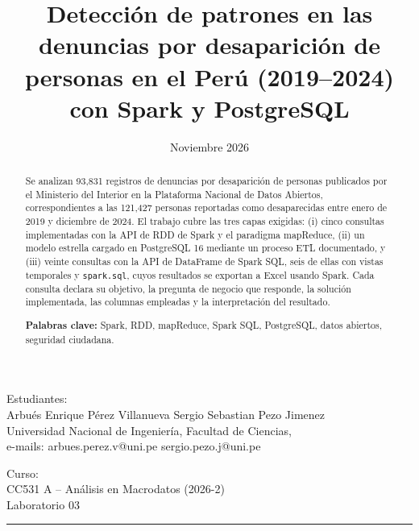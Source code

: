 \documentclass[10pt,a4paper]{article}
\title{Detecci\'on de patrones en las denuncias por desaparici\'on de personas en el Per\'u (2019--2024) con Spark y PostgreSQL}
\date{Noviembre 2026}
\theoremstyle{definition}
\begin{document}
\sloppy

\maketitle

\begin{center}
  Estudiantes:\\
  \vspace{5pt}
  {\large Arbu\'es Enrique P\'erez Villanueva \quad Sergio Sebastian Pezo Jimenez}\\
  Universidad Nacional de Ingenier\'ia, Facultad de Ciencias,\\
  e-mails: arbues.perez.v@uni.pe \quad sergio.pezo.j@uni.pe
\end{center}
\vspace{5pt}
\begin{center}
  Curso:\\
  \vspace{5pt}
  {\large CC531 A -- An\'alisis en Macrodatos (2026-2)}\\
  {\large Laboratorio 03}
\end{center}
\vspace{20pt}

\begin{abstract}
{\small
\hspace*{0.5cm}
Se analizan 93,831 registros de denuncias por desaparici\'on de personas publicados por el
Ministerio del Interior en la Plataforma Nacional de Datos Abiertos, correspondientes a las
121,427 personas reportadas como desaparecidas entre enero de 2019 y diciembre de 2024. El
trabajo cubre las tres capas exigidas: (i) cinco consultas implementadas con la API de RDD de
Spark y el paradigma mapReduce, (ii) un modelo estrella cargado en PostgreSQL 16 mediante un
proceso ETL documentado, y (iii) veinte consultas con la API de DataFrame de Spark SQL, seis de
ellas con vistas temporales y \texttt{spark.sql}, cuyos resultados se exportan a Excel usando
Spark. Cada consulta declara su objetivo, la pregunta de negocio que responde, la soluci\'on
implementada, las columnas empleadas y la interpretaci\'on del resultado.

\textbf{Palabras clave:} Spark, RDD, mapReduce, Spark SQL, PostgreSQL, datos abiertos, seguridad ciudadana.
}
\end{abstract}

\tableofcontents

\vspace{20pt}
\hrule
\vspace{10pt}
\end{document}
